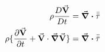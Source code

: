 \begin{equation}
  \begin{aligned}
    \rho\frac{D\va{V}}{Dt}
    &= \div\bar{\bar{\tau}} \\
    \rho 
    \{
      \pdv{\va{V}}{t} 
      +  \va{V}\cdot\grad\va{V}
    \} 
    &= \div{\bar{\bar{\tau}}}
  \end{aligned}
\end{equation}

